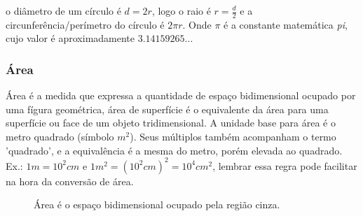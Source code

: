\begin{multicols*}{2}
    o diâmetro de um círculo é $d = 2r$, logo o raio é $r = \frac{d}{2}$ e a circunferência/perímetro do círculo é $2\pi r$.
    Onde $\pi$ é a constante matemática \textit{pi}, cujo valor é aproximadamente $3.14159265...$


    \subsubsection*{Área}
    Área é a medida que expressa a quantidade de espaço bidimensional ocupado por uma fígura geométrica,
    área de superfície é o equivalente da área para uma superfície ou face de um objeto tridimensional. A unidade base
    para área é o metro quadrado (símbolo ${m^2}$). Seus múltiplos também acompanham o termo 'quadrado',
    e a equivalência é a mesma do metro, porém elevada ao quadrado. Ex.: $1m = 10^2cm$ e $1m^2 = (10^2cm)^2 = 10^4cm^2$,
    lembrar essa regra pode facilitar na hora da conversão de área.

    \begin{figure}[H]
        \centering
        \caption{Área é o espaço bidimensional ocupado pela região cinza.}
        \label{fig:tri_abc}
    \end{figure}


\end{multicols*}
